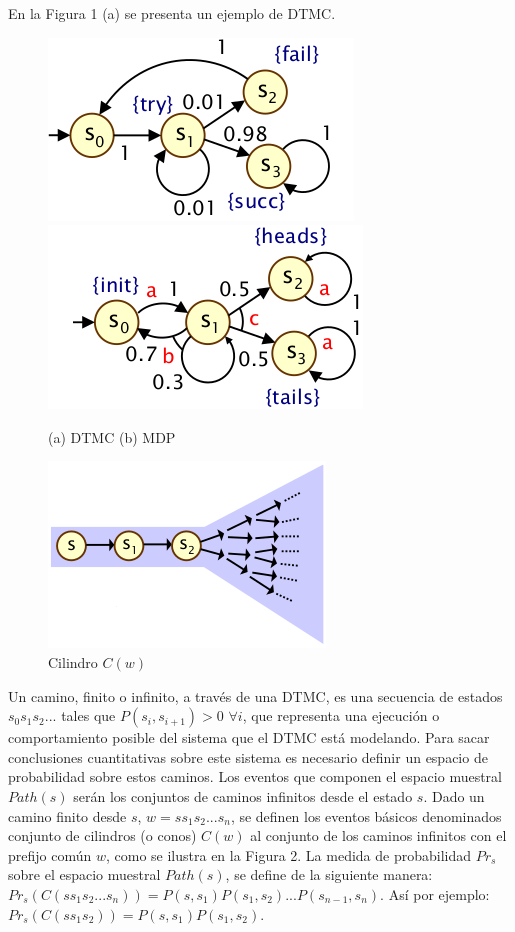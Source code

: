 \documentclass[11pt]{article}
\begin{document}
En la Figura 1 (a) se presenta un ejemplo de DTMC.

\begin{figure}[h]
	\includegraphics[scale=0.6]{DTMC.png} \includegraphics[scale=0.6]{MDP.png}
	\centering
	\caption{(a) DTMC \hspace{2cm} (b) MDP}
\end{figure}

\begin{figure}[h]
	\includegraphics[scale=0.6]{cone.png}
	\centering
	\caption{Cilindro $C(w)$}
\end{figure}

Un camino, finito o infinito, a trav\'es de una DTMC, es una secuencia de estados $s_0s_1s_2...$ tales que $P(s_i, s_{i+1}) > 0$ $\forall i$, que representa una ejecuci\'on o comportamiento posible del sistema que el DTMC est\'a modelando. Para sacar conclusiones cuantitativas sobre este sistema es necesario definir un espacio de probabilidad sobre estos caminos. Los eventos que componen el espacio muestral $Path(s)$ ser\'an los conjuntos de caminos infinitos desde el estado $s$.  Dado un camino finito desde $s$, $w = ss_1s_2...s_n$, se definen los eventos b\'asicos denominados conjunto de cilindros (o conos) $C(w)$ al conjunto de los caminos infinitos con el prefijo com\'un $w$, como se ilustra en la Figura 2. La medida de probabilidad $Pr_s$ sobre el espacio muestral $Path(s)$, se define de la siguiente manera: $Pr_s(C(ss_1s_2...s_n)) = P(s,s_1)P(s_1,s_2)...P(s_{n-1}, s_n)$. As\'i por ejemplo: $Pr_s(C(ss_1s_2)) = P(s,s_1)P(s_1,s_2)$. \\
\end{document}
